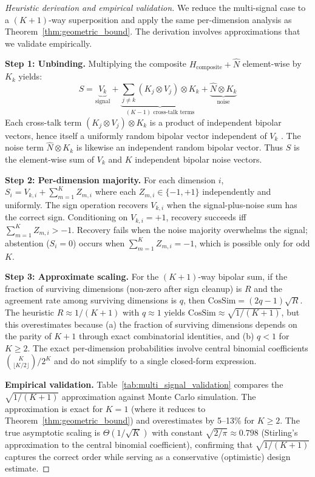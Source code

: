 \documentclass[a4paper,11pt]{article}
\begin{document}
\begin{proof}[Heuristic derivation and empirical validation]
We reduce the multi-signal case to a $(K{+}1)$-way superposition and apply the same per-dimension analysis as Theorem~\ref{thm:geometric_bound}. The derivation involves approximations that we validate empirically.

\textbf{Step 1: Unbinding.}
Multiplying the composite $H_{\text{composite}} + \hat{N}$ element-wise by $K_k$ yields:
\begin{equation}
    S = \underbrace{V_k}_{\text{signal}} + \underbrace{\sum_{j \neq k} (K_j \otimes V_j) \otimes K_k}_{(K-1) \text{ cross-talk terms}} + \underbrace{\hat{N} \otimes K_k}_{\text{noise}}
\end{equation}
Each cross-talk term $(K_j \otimes V_j) \otimes K_k$ is a product of independent bipolar vectors, hence itself a uniformly random bipolar vector independent of $V_k$ \cite{kanerva2009}. The noise term $\hat{N} \otimes K_k$ is likewise an independent random bipolar vector. Thus $S$ is the element-wise sum of $V_k$ and $K$ independent bipolar noise vectors.

\textbf{Step 2: Per-dimension majority.}
For each dimension $i$, $S_i = V_{k,i} + \sum_{m=1}^{K} Z_{m,i}$ where each $Z_{m,i} \in \{-1,+1\}$ independently and uniformly. The sign operation recovers $V_{k,i}$ when the signal-plus-noise sum has the correct sign. Conditioning on $V_{k,i} = +1$, recovery succeeds iff $\sum_{m=1}^{K} Z_{m,i} > -1$. Recovery fails when the noise majority overwhelms the signal; abstention ($S_i = 0$) occurs when $\sum_{m=1}^{K} Z_{m,i} = -1$, which is possible only for odd $K$.

\textbf{Step 3: Approximate scaling.}
For the $(K{+}1)$-way bipolar sum, if the fraction of surviving dimensions (non-zero after sign cleanup) is $R$ and the agreement rate among surviving dimensions is $q$, then $\text{CosSim} = (2q - 1)\sqrt{R}$. The heuristic $R \approx 1/(K{+}1)$ with $q \approx 1$ yields $\text{CosSim} \approx \sqrt{1/(K+1)}$, but this overestimates because (a) the fraction of surviving dimensions depends on the parity of $K{+}1$ through exact combinatorial identities, and (b) $q < 1$ for $K \geq 2$. The exact per-dimension probabilities involve central binomial coefficients $\binom{K}{\lfloor K/2 \rfloor}/2^K$ and do not simplify to a single closed-form expression.

\textbf{Empirical validation.} Table~\ref{tab:multi_signal_validation} compares the $\sqrt{1/(K+1)}$ approximation against Monte Carlo simulation. The approximation is exact for $K = 1$ (where it reduces to Theorem~\ref{thm:geometric_bound}) and overestimates by 5--13\% for $K \geq 2$. The true asymptotic scaling is $\Theta(1/\sqrt{K})$ with constant $\sqrt{2/\pi} \approx 0.798$ (Stirling's approximation to the central binomial coefficient), confirming that $\sqrt{1/(K+1)}$ captures the correct order while serving as a conservative (optimistic) design estimate.


\end{proof}
\end{document}
